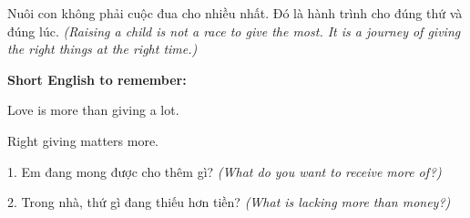 \begin{baihoc}
Nuôi con không phải cuộc đua cho nhiều nhất. Đó là hành trình cho đúng thứ và đúng lúc.
\textit{(Raising a child is not a race to give the most. It is a journey of giving the right things at the right time.)}
\end{baihoc}

\begin{ghinhoanh}
\textbf{Short English to remember:}

Love is more than giving a lot.

Right giving matters more.
\end{ghinhoanh}

\begin{tuhocnhanh}
1. Em đang mong được cho thêm gì? \textit{(What do you want to receive more of?)}

2. Trong nhà, thứ gì đang thiếu hơn tiền? \textit{(What is lacking more than money?)}
\end{tuhocnhanh}
\ngancach